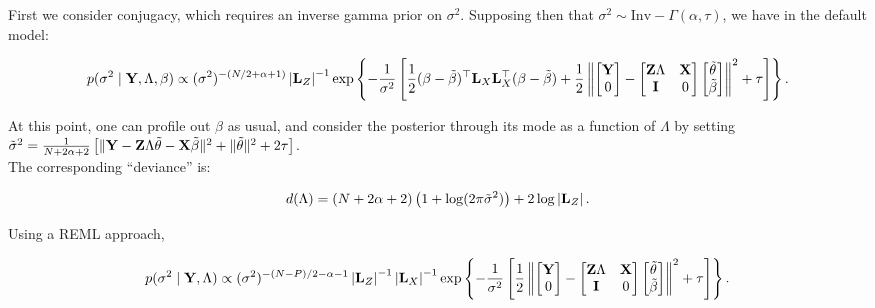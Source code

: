 \documentclass[10pt]{article}
\begin{document}
First we consider conjugacy, which requires an inverse gamma prior on $\sigma^2$. Supposing then
that $\sigma^2 \sim \mathrm{Inv}-\Gamma(\alpha, \tau)$, we have in the default model:

\begin{equation*}
p(\sigma^2 \mid {\bf Y}, \Lambda, \beta) \propto
(\sigma^2)^{-(N/2 + \alpha + 1)}\left|{\bf L}_Z\right|^{-1}
\exp\left\{-\frac{1}{\sigma^2}\left[
\frac{1}{2}(\beta - \tilde\beta)^\top{\bf L}_X{\bf L}_X^\top(\beta -
\tilde\beta) + \frac{1}{2}
\left\|\begin{bmatrix} {\bf Y} \\ 0 \end{bmatrix} -
\begin{bmatrix} {\bf Z}\Lambda & {\bf X} \\ {\bf I} & 0 \end{bmatrix}
\begin{bmatrix}\tilde\theta \\ \tilde\beta \end{bmatrix} \right\|^2 +
\tau
\right]\right\}.
\end{equation*}

At this point, one can profile out $\beta$ as usual, and consider the posterior
through its mode as a function of $\Lambda$ by setting $\tilde{\sigma}^2
= \frac{1}{N+ 2\alpha + 2}\left[\|{\bf Y} - {\bf Z}\Lambda\tilde\theta
  - {\bf X}\tilde\beta\|^2 + \|\tilde\theta\|^2 + 2\tau\right]$. \\

The corresponding ``deviance'' is:

\begin{equation*}
d(\Lambda) = (N + 2\alpha + 2)\left(1 + \log(2 \pi\tilde\sigma^2)\right)
+ 2 \log\left|{\bf L}_Z\right|.
\end{equation*}

Using a REML approach,

\begin{equation*}
p(\sigma^2 \mid {\bf Y}, \Lambda) \propto (\sigma^2)^{-(N - P)/2 -
  \alpha - 1} \left|{\bf L}_Z\right|^{-1} \left|{\bf L}_X\right|^{-1}
\exp\left\{-\frac{1}{\sigma^2}\left[ \frac{1}{2}
\left\|\begin{bmatrix} {\bf Y} \\ 0 \end{bmatrix} -
\begin{bmatrix} {\bf Z}\Lambda & {\bf X} \\ {\bf I} & 0 \end{bmatrix}
\begin{bmatrix}\tilde\theta \\ \tilde\beta \end{bmatrix} \right\|^2 +
\tau
\right]\right\}.
\end{equation*}
\end{document}
